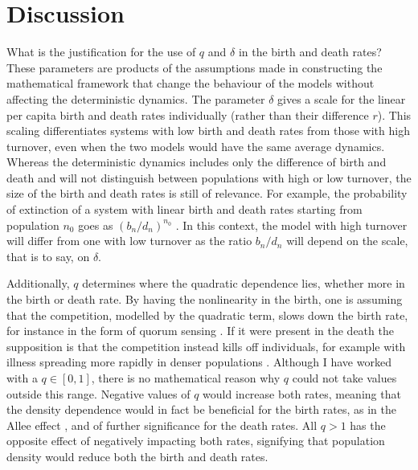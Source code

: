 \section{Discussion}

What is the justification for the use of $q$ and $\delta$ in the birth and death rates? 
These parameters are products of the assumptions made in constructing the mathematical framework that change the behaviour of the models without affecting the deterministic dynamics.
The parameter $\delta$ gives a scale for the linear per capita birth and death rates individually (rather than their difference $r$).
This scaling differentiates systems with low birth and death rates from those with high turnover, even when the two models would have the same average dynamics. 
Whereas the deterministic dynamics includes only the difference of birth and death and will not distinguish between populations with high or low turnover, the size of the birth and death rates is still of relevance. 
For example, the probability of extinction of a system with linear birth and death rates starting from population $n_0$ goes as $(b_n/d_n)^{n_0}$ \cite{Nisbet1982}.
In this context, the model with high turnover will differ from one with low turnover as the ratio $b_n/d_n$ will depend on the scale, that is to say, on $\delta$. 

Additionally, $q$ determines where the quadratic dependence lies, whether more in the birth or death rate. 
By having the nonlinearity in the birth, one is assuming that the competition, modelled by the quadratic term, slows down the birth rate, for instance in the form of quorum sensing \cite{Nadell2008}. %
If it were present in the death the supposition is that the competition instead kills off individuals, for example with illness spreading more rapidly in denser populations \cite{}.
Although I have worked with a $q \in [0,1]$, there is no mathematical reason why $q$ could not take values outside this range. 
Negative values of $q$ would increase both rates, meaning that the density dependence would in fact be beneficial for the birth rates, as in the Allee effect \cite{}, and of further significance for the death rates. 
All $q>1$ has the opposite effect of negatively impacting both rates, signifying that population density would reduce both the birth and death rates. %

